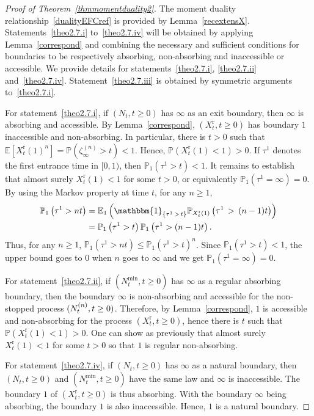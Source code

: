 \documentclass[10pt]{amsart}
\theoremstyle{definition}\newtheorem{defi}[theo]{Definition}\newtheorem{rema}[theo]{Remark}\newtheorem{exam}[theo]{Example}\newtheorem{exem}[theo]{Example}\newtheorem{nota}[theo]{Notation}
\newcommand{\rmr}{\mathrm{r}}
\newcommand{\bbmun}{\mathbbm{1}}
\newcommand{\bbE}{\mathbb{E}}
\newcommand{\bbP}{\mathbb{P}}
\begin{document}
\begin{proof}[{Proof of Theorem~\ref{thmmomentduality2}}] The moment duality relationship~\eqref{dualityEFCref} is provided by Lemma~\ref{recextensX}. Statements~\eqref{theo2.7.i} to~\eqref{theo2.7.iv}  will be obtained by applying Lemma~\ref{correspond} and combining the necessary and sufficient conditions for boundaries to be respectively absorbing, non-absorbing and inaccessible or accessible. We provide details for statements~\eqref{theo2.7.i}, \eqref{theo2.7.ii} and~\eqref{theo2.7.iv}. Statement~\eqref{theo2.7.iii} is obtained by symmetric arguments to~\eqref{theo2.7.i}.

For statement~\eqref{theo2.7.i}, if $(N_t,t\geq 0)$ has $\infty$ as an exit boundary, then $\infty$ is absorbing and accessible. By Lemma~\ref{correspond}, $(X_t^{\rmr},t\geq 0)$ has boundary $1$ inaccessible and non-absorbing. In particular, there is $t>0$ such that $\bbE[X_t^{\rmr}(1)^{n}]=\bbP(\zeta^{(n)}_\infty>t)<1$. Hence, $\bbP(X^{\rmr}_t(1)<1)>0$. If $\tau^1$ denotes the first entrance time in $[0,1)$, then $\bbP_1(\tau^1>t)<1$. It remains to establish that almost surely $X^{\rmr}_t(1)<1$ for some $t>0$, or equivalently $\bbP_1(\tau^1=\infty)=0$. By using the Markov property at time $t$, for any $n\geq 1$,
\begin{align*}
\bbP_1\left(\tau^1>nt\right) &=\bbE_1\left(\bbmun_{\left\{\tau^1\,>\,t\right\}}\bbP_{X^{\rmr}_{t}(1)}\left(\tau^1\,>\,(n-1)t\right)\right)\\
&=\bbP_{1}\left(\tau^1>t\right)\bbP_1\left(\tau^1>(n-1)t\right).
\end{align*}
Thus, for any $n\geq 1$, $\bbP_1(\tau^1>nt)\leq \bbP_1(\tau^1>t)^n$. Since $\bbP_1(\tau^1>t)<1$, the upper bound goes to $0$ when $n$ goes to $\infty$ and we get $\bbP_1(\tau^1=\infty)=0$.

\pagebreak
For statement~\eqref{theo2.7.ii}, if $(N^{\min}_t,t\geq 0)$ has $\infty$ as a regular absorbing boundary, then the boundary $\infty$ is non-absorbing and accessible for the non-stopped process $(N_t^{(n)},\linebreak t\geq 0)$. Therefore, by Lemma~\ref{correspond}, $1$ is accessible and non-absorbing for the process $(X_t^{\rmr},t\geq 0)$, hence there is $t$ such that $\bbP(X^{\rmr}_t(1)<1)>0$. One can show as previously that almost surely $X^{\rmr}_t(1)<1$ for some $t>0$ so that $1$ is regular non-absorbing.

For statement~\eqref{theo2.7.iv}, if $(N_t,t\geq 0)$ has $\infty$ as a natural boundary, then $(N_t,t\geq 0)$ and $(N^{\min}_t,t\geq 0)$ have the same law and $\infty$ is inaccessible. The boundary $1$ of $(X_t^{\rmr},t\geq 0)$ is thus absorbing. With the boundary $\infty$ being absorbing, the boundary $1$ is also inaccessible. Hence, $1$ is a natural boundary.
\end{proof}
\end{document}

